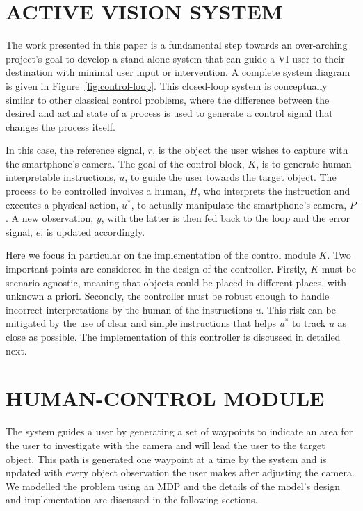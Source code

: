 \documentclass[a4paper, twoside]{article}
\begin{document}
\section{\uppercase{Active Vision System}}\label{sec:system-design}

\noindent The work presented in this paper is a fundamental step towards an over-arching project's goal to develop a stand-alone system that can guide a VI user to their destination with minimal user input or intervention. A complete system diagram is given in Figure~\ref{fig:control-loop}. This closed-loop system is conceptually similar to other classical control problems, where the difference between the desired and actual state of a process is used to generate a control signal that changes the process itself.

In this case, the reference signal, $r$, is the object the user wishes to capture with the smartphone's camera. The goal of the control block, $K$, is to generate human interpretable instructions, $u$, to guide the user towards the target object. The process to be controlled involves a human, $H$, who interprets the instruction and executes a physical action, $u^*$, to actually manipulate the smartphone's camera, $P$. A new observation, $y$, with the latter is then fed back to the loop and the error signal, $e$, is updated accordingly.  

Here we focus in particular on the implementation of the control module $K$. Two important points are considered in the design of the controller. Firstly, $K$ must be scenario-agnostic, meaning that objects could be placed in different places, with unknown a priori. Secondly, the controller must be robust enough to handle incorrect interpretations by the human of the instructions $u$. This risk can be mitigated by the use of clear and simple instructions that helps $u^*$ to track $u$ as close as possible. The implementation of this controller is discussed in detailed next. 

\section{\uppercase{Human-control Module}}\label{sec:controller-design}

\noindent The system guides a user by generating a set of waypoints to indicate an area for the user to investigate with the camera and will lead the user to the target object. This path is generated one waypoint at a time by the system and is updated with every object observation the user makes after adjusting the camera. We modelled the problem using an MDP and the details of the model's design and implementation are discussed in the following sections. %
\end{document}
